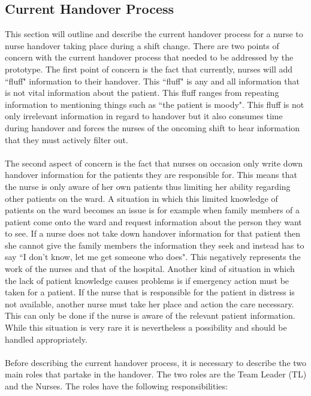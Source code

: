 \subsection{Current Handover Process}
\label{Current Handover Process}
This section will outline and describe the current handover process for a nurse to nurse handover taking place during a shift change. There are two points of concern with the current handover process that needed to be addressed by the prototype. The first point of concern is the fact that currently, nurses will add ``fluff" information to their handover. This ``fluff" is any and all information that is not vital information about the patient. This fluff ranges from repeating information to mentioning things such as ``the patient is moody". This fluff is not only irrelevant information in regard to handover but it also consumes time during handover and forces the nurses of the oncoming shift to hear information that they must actively filter out.
\\ \\
The second aspect of concern is the fact that nurses on occasion only write down handover information for the patients they are responsible for. This means that the nurse is only aware of her own patients thus limiting her ability regarding other patients on the ward. A situation in which this limited knowledge of patients on the ward becomes an issue is for example when family members of a patient come onto the ward and request information about the person they want to see. If a nurse does not take down handover information for that patient then she cannot give the family members the information they seek and instead has to say ``I don't know, let me get someone who does". This negatively represents the work of the nurses and that of the hospital. Another kind of situation in which the lack of patient knowledge causes problems is if emergency action must be taken for a patient. If the nurse that is responsible for the patient in distress is not available, another nurse must take her place and action the care necessary. This can only be done if the nurse is aware of the relevant patient information. While this situation is very rare it is nevertheless a possibility and should be handled appropriately. 
\\ \\
Before describing the current handover process, it is necessary to describe the two main roles that partake in the handover. The two roles are the Team Leader (TL) and the Nurses. The roles have the following responsibilities: \\ \\


